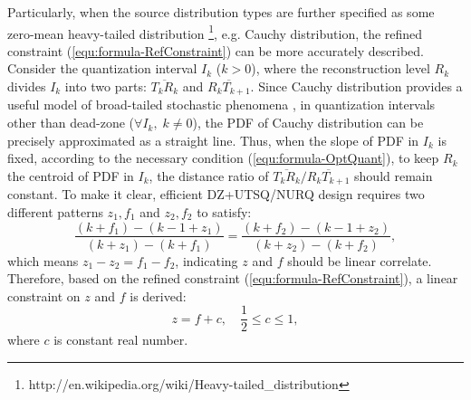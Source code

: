 \documentclass[smallabstract,smallcaptions]{dccpaper}
\begin{document}
Particularly, when the source distribution types are further specified as some zero-mean heavy-tailed distribution \footnote{http://en.wikipedia.org/wiki/Heavy-tailed\_distribution}, e.g. Cauchy distribution, the refined constraint (\ref{equ:formula-RefConstraint}) can be more accurately described. Consider the quantization interval $I_k$ ($k > 0$), where the reconstruction level $R_k$ divides $I_k$ into two parts: $\overline{T_k R_k}$ and $\overline{R_k T_{k+1}}$. Since Cauchy distribution provides a useful model of broad-tailed stochastic phenomena \cite{Farvardin_TIT1984}, in quantization intervals other than dead-zone ($\forall I_k, \; k \ne 0$), the PDF of Cauchy distribution can be precisely approximated as a straight line. Thus, when the slope of PDF in $I_k$ is fixed, according to the necessary condition (\ref{equ:formula-OptQuant}), to keep $R_k$ the centroid of PDF in $I_k$, the distance ratio of $\overline{T_k R_k} / \overline{R_k T_{k+1}}$ should remain constant. To make it clear, efficient DZ+UTSQ/NURQ design requires two different patterns $z_1, f_1$ and $z_2, f_2$ to satisfy:
\begin{equation}\label{equ:formula-ratio}
\frac{(k+f_1)-(k-1+z_1)}{(k+z_1)-(k+f_1)} = \frac{(k+f_2)-(k-1+z_2)}{(k+z_2)-(k+f_2)},
\end{equation}
which means $z_1 - z_2 = f_1 - f_2$, indicating $z$ and $f$ should be linear correlate. Therefore, based on the refined constraint (\ref{equ:formula-RefConstraint}), a linear constraint on $z$ and $f$ is derived:
\begin{equation}\label{equ:formula-LinearConstraint}
	z = f+c, \quad \frac{1}{2} \le c \le 1, 
\end{equation}
where $c$ is constant real number.
\end{document}
